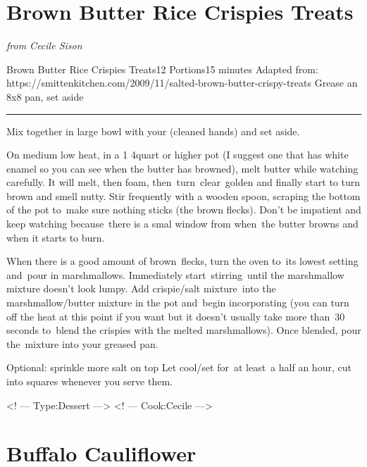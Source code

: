 \documentclass[openany]{book}
\begin{document}
\chapter{Brown Butter Rice Crispies
Treats}\label{brown-butter-rice-crispies-treats}

\emph{from Cecile Sison}

\begin{recipe}{Brown Butter Rice Crispies Treats}{12 Portions}{15 minutes}
\freeform Adapted from: https://smittenkitchen.com/2009/11/salted-brown-butter-crispy-treats
\freeform Grease an 8x8 pan, set aside
\freeform\rule{\textwidth}{0.05pt}

Mix together in large bowl with your (cleaned hands) and set aside.

On medium low heat, in a 1 4quart or higher pot (I suggest one that has white enamel so you can see when the butter has browned), melt butter while watching carefully. It will melt, then foam, then turn clear golden and finally start to turn brown and smell nutty. Stir frequently with a wooden spoon, scraping the bottom of the pot to make sure nothing sticks (the brown flecks). Don't be impatient and keep watching because there is a smal window from when the butter browns and when it starts to burn. 

When there is a good amount of brown flecks, turn the oven to its lowest setting and pour in marshmallows. Immediately start stirring until the marshmallow mixture doesn't look lumpy.
Add crispie/salt mixture into the marshmallow/butter mixture in the pot and begin incorporating (you can turn off the heat at this point if you want but it doesn't usually take more than 30 seconds to blend the crispies with the melted marshmallows).
Once blended, pour the mixture into your greased pan.

\freeform Optional: sprinkle more salt on top
\freeform Let cool/set for at least a half an hour, cut into squares whenever you serve them.

\end{recipe}

\textless{}! --- Type:Dessert ---\textgreater{} \textless{}! ---
Cook:Cecile ---\textgreater{}

\chapter{Buffalo Cauliflower}\label{buffalo-cauliflower}
\end{document}
